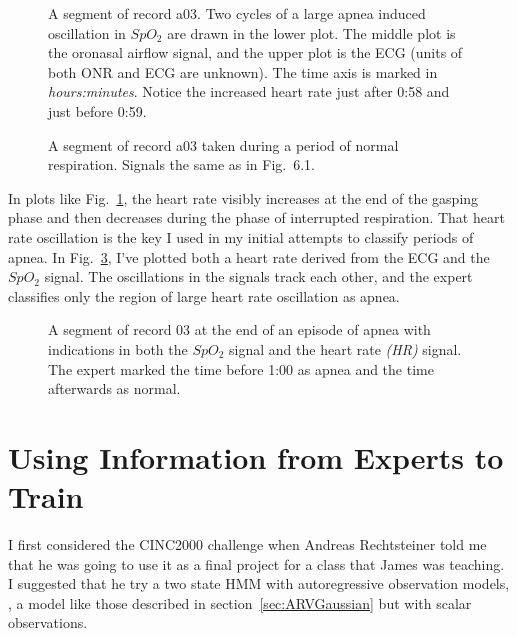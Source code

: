 \begin{figure}
  \caption[A segment of record a03]%
  {A segment of record a03.  Two cycles of a large apnea
    induced oscillation in $SpO_2$ are drawn in the lower plot.  The
    middle plot is the oronasal airflow signal, and the upper plot is
    the ECG (units of both ONR and ECG are unknown).  The time
    axis is marked in \emph{hours:minutes}.  Notice the increased
    heart rate just after 0:58 and just before 0:59.}
  \label{fig:a03erA}
\end{figure}

\begin{figure}
  \caption[A segment of record a03]%
  {A segment of record a03 taken during a period of normal
    respiration.  Signals the same as in Fig.~6.1.}
  \label{fig:a03erN}
\end{figure}

In plots like Fig.~\ref{fig:a03erA}, the heart rate visibly increases
at the end of the gasping phase and then decreases during the phase of
interrupted respiration.  That heart rate oscillation is the key I
used in my initial attempts to classify periods of apnea.  In
Fig.~\ref{fig:a03erHR}, I've plotted both a heart rate derived from
the ECG  and the $SpO_2$
signal.  The oscillations in the signals track each other, and the
expert classifies only the region of large heart rate oscillation as
apnea.
\begin{figure}
  \caption[A segment of record 03 at the end of an episode of apnea]%
  {A segment of record 03 at the end of an episode of apnea with
    indications in both the $SpO_2$ signal and the heart rate
    \emph{(HR)} signal.  The expert marked the time before 1:00 as
    apnea and the time afterwards as normal.}
  \label{fig:a03erHR}
\end{figure}

\section{Using Information from Experts to Train}

I first considered the CINC2000 challenge when Andreas
Rechtsteiner told me that he was going to use it as a final project
for a class that James was teaching.  I suggested that he try a two
state HMM with autoregressive observation models, \ie, a model like
those described in section~\ref{sec:ARVGaussian} but with scalar
observations.

